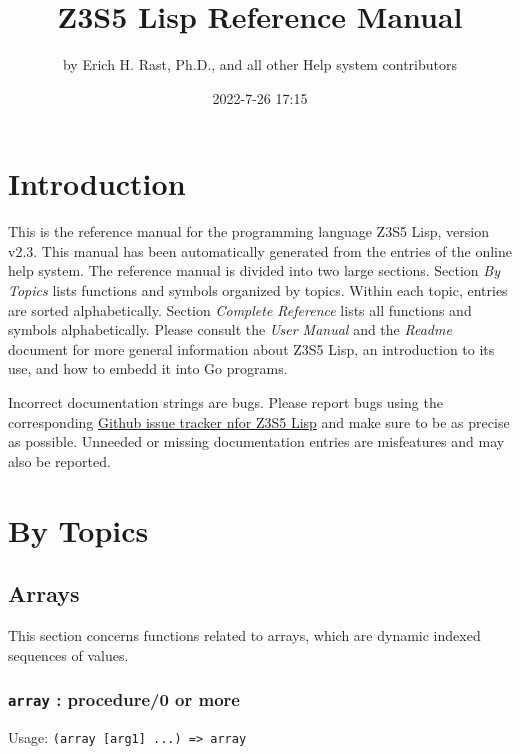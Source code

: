 \documentclass[
]{article}
\title{Z3S5 Lisp Reference Manual}
\author{by Erich H. Rast, Ph.D., and all other Help system contributors}
\date{2022-7-26 17:15}
\newcommand{\passthrough}[1]{#1}
\begin{document}
\maketitle

\hypertarget{introduction}{%
\section{Introduction}\label{introduction}}

This is the reference manual for the programming language Z3S5 Lisp,
version v2.3. This manual has been automatically generated from the
entries of the online help system. The reference manual is divided into
two large sections. Section \emph{By Topics} lists functions and symbols
organized by topics. Within each topic, entries are sorted
alphabetically. Section \emph{Complete Reference} lists all functions
and symbols alphabetically. Please consult the \emph{User Manual} and
the \emph{Readme} document for more general information about Z3S5 Lisp,
an introduction to its use, and how to embedd it into Go programs.

Incorrect documentation strings are bugs. Please report bugs using the
corresponding \href{https://github.com/rasteric/z3s5-lisp/issues}{Github
issue tracker nfor Z3S5 Lisp} and make sure to be as precise as
possible. Unneeded or missing documentation entries are misfeatures and
may also be reported.

\hypertarget{by-topics}{%
\section{By Topics}\label{by-topics}}

\hypertarget{arrays}{%
\subsection{Arrays}\label{arrays}}

This section concerns functions related to arrays, which are dynamic
indexed sequences of values.

\hypertarget{array-procedure0-or-more}{%
\subsubsection{\texorpdfstring{\texttt{array} : procedure/0 or
more}{array : procedure/0 or more}}\label{array-procedure0-or-more}}

Usage: \passthrough{\lstinline!(array [arg1] ...) => array!}
\end{document}
